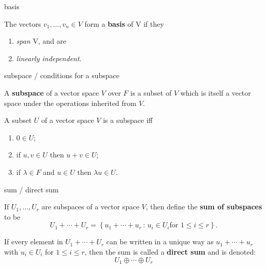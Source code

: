 \documentclass[avery5371,grid]{flashcards}
\renewcommand{\le}{\leqslant}
\newcommand{\set}[2]{\ensuremath{\left\{ #1 \, : \, #2 \right\}}}
\newcommand{\defn}[1]{\textbf{#1}}
\begin{document}

\begin{flashcard}[Definition]{basis}

  The vectors $v_1, \ldots , v_n \in V$ form a \defn{basis} of V if
  they
  \begin{enumerate}
  \item \emph{span} V, and are
  \item \emph{linearly independent}.
  \end{enumerate}

\end{flashcard}

\begin{flashcard}{subspace / conditions for a subspace}

  A \defn{subspace} of a vector space $V$ over $F$ is a subset of $V$
  which is itself a vector space under the operations inherited from
  $V$.
  \vfill

  A subset $U$ of a vector space $V$ is a subspace iff
  \begin{enumerate}
  \item $0\in U$;
  \item if $u,v \in U$ then $u+v \in U$;
  \item if $\lambda \in F$ and $u \in U$ then $\lambda u \in U$.
  \end{enumerate}

\end{flashcard}

\begin{flashcard}[Definition]{sum / direct sum}

  If $U_1, \ldots, U_r$ are subspaces of a vector space $V$, then
  define the \defn{sum of subspaces} to be
  \[
    U_1 + \cdots + U_r = \set{u_1 + \cdots + u_r}{u_i \in U_i \text{
        for } 1 \le i \le r}.
  \]
  \vfill

  If every element in $U_1 + \cdots + U_r$ can be written in a unique
  way as $u_1 + \cdots + u_r$ with $u_i \in U_i$ for $1 \le i \le r$,
  then the sum is called a \defn{direct sum} and is denoted:
  \[
    U_1 \oplus \cdots \oplus U_r
  \]

\end{flashcard}
\end{document}
